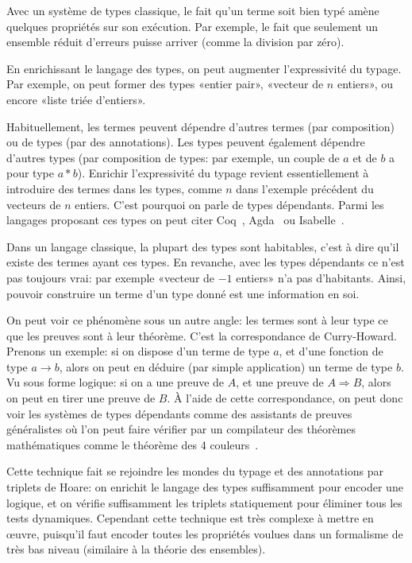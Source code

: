 Avec un système de types classique, le fait qu'un terme soit bien typé amène
quelques propriétés sur son exécution. Par exemple, le fait que seulement un
ensemble réduit d'erreurs puisse arriver (comme la division par zéro).

En enrichissant le langage des types, on peut augmenter l'expressivité du
typage. Par exemple, on peut former des types «entier pair», «vecteur de $n$
entiers», ou encore «liste triée d'entiers».

Habituellement, les termes peuvent dépendre d'autres termes (par composition) ou
de types (par des annotations). Les types peuvent également dépendre d'autres
types (par composition de types: par exemple, un couple de $a$ et de $b$ a pour
type $a * b$). Enrichir l'expressivité du typage revient essentiellement à
introduire des termes dans les types, comme $n$ dans l'exemple précédent du
vecteurs de $n$ entiers. C'est pourquoi on parle de types dépendants. Parmi les
langages proposant ces types on peut citer Coq~\cite{coqmanual},
Agda~\cite{agdatutorial} ou Isabelle~\cite{isabelletutorial}.

Dans un langage classique, la plupart des types sont habitables, c'est à dire
qu'il existe des termes ayant ces types. En revanche, avec les types dépendants
ce n'est pas toujours vrai: par exemple «vecteur de $-1$ entiers» n'a pas
d'habitants. Ainsi, pouvoir construire un terme d'un type donné est une
information en soi.


On peut voir ce phénomène sous un autre angle: les termes sont à leur type ce
que les preuves sont à leur théorème. C'est la correspondance de Curry-Howard.
Prenons un exemple: si on dispose d'un terme de type $a$, et d'une fonction de
type $a → b$, alors on peut en déduire (par simple application) un terme de type
$b$. Vu sous forme logique: si on a une preuve de $A$, et une preuve de $A ⇒
B$, alors on peut en tirer une preuve de $B$. À l'aide de cette correspondance,
on peut donc voir les systèmes de types dépendants comme des assistants de
preuves généralistes où l'on peut faire vérifier par un compilateur des
théorèmes mathématiques comme le théorème des 4 couleurs~\cite{4colproof}.


Cette technique fait se rejoindre les mondes du typage et des annotations par
triplets de Hoare: on enrichit le langage des types suffisamment pour encoder
une logique, et on vérifie suffisamment les triplets statiquement pour éliminer
tous les tests dynamiques. Cependant cette technique est très complexe à mettre
en œuvre, puisqu'il faut encoder toutes les propriétés voulues dans un
formalisme de très bas niveau (similaire à la théorie des ensembles).

